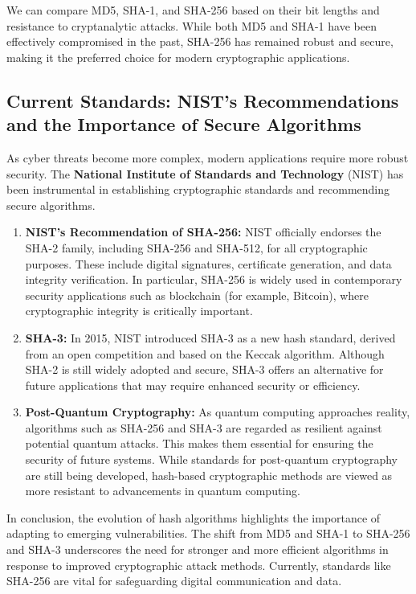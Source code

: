 \documentclass[11pt,a4paper]{article}
\begin{document}
        We can compare MD5, SHA-1, and SHA-256 based on their bit lengths and resistance to cryptanalytic attacks. While both MD5 and SHA-1 have been effectively compromised in the past, SHA-256 has remained robust and secure, making it the preferred choice for modern cryptographic applications.

    \subsection*{Current Standards: NIST's Recommendations and the Importance of Secure Algorithms}
    As cyber threats become more complex, modern applications require more robust security. The \textbf{National Institute of Standards and Technology} (NIST) has been instrumental in establishing cryptographic standards and recommending secure algorithms.

        \begin{enumerate}
            \item \textbf{NIST's Recommendation of SHA-256:} NIST officially endorses the SHA-2 family, including SHA-256 and SHA-512, for all cryptographic purposes. These include digital signatures, certificate generation, and data integrity verification. In particular, SHA-256 is widely used in contemporary security applications such as blockchain (for example, Bitcoin), where cryptographic integrity is critically important.

            \item \textbf{SHA-3:} In 2015, NIST introduced SHA-3 as a new hash standard, derived from an open competition and based on the Keccak algorithm. Although SHA-2 is still widely adopted and secure, SHA-3 offers an alternative for future applications that may require enhanced security or efficiency.

            \item \textbf{Post-Quantum Cryptography:} As quantum computing approaches reality, algorithms such as SHA-256 and SHA-3 are regarded as resilient against potential quantum attacks. This makes them essential for ensuring the security of future systems. While standards for post-quantum cryptography are still being developed, hash-based cryptographic methods are viewed as more resistant to advancements in quantum computing.

        \end{enumerate} 

        In conclusion, the evolution of hash algorithms highlights the importance of adapting to emerging vulnerabilities. The shift from MD5 and SHA-1 to SHA-256 and SHA-3 underscores the need for stronger and more efficient algorithms in response to improved cryptographic attack methods. Currently, standards like SHA-256 are vital for safeguarding digital communication and data.
\end{document}

